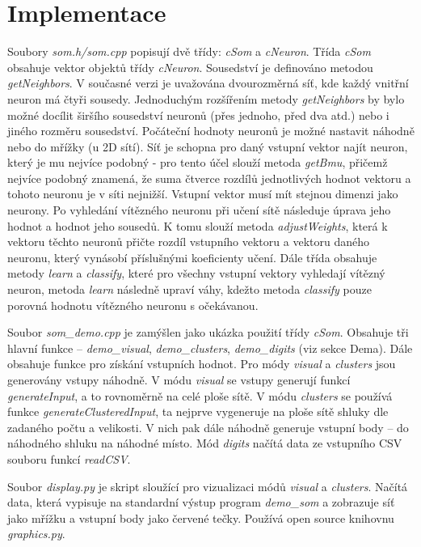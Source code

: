 \documentclass[12pt]{article}
\begin{document}
\section*{Implementace}
Soubory \textit{som.h/som.cpp} popisují dvě třídy: \textit{cSom} a \textit{cNeuron}. Třída \textit{cSom} obsahuje vektor objektů třídy \textit{cNeuron}. Sousedství je definováno metodou \textit{getNeighbors}. V současné verzi je uvažována dvourozměrná síť, kde každý vnitřní neuron má čtyři sousedy. Jednoduchým rozšířením metody \textit{getNeighbors} by bylo možné docílit širšího sousedství neuronů (přes jednoho, před dva atd.) nebo i jiného rozměru sousedství. Počáteční hodnoty neuronů je možné nastavit náhodně nebo do mřížky (u 2D sítí). Síť je schopna pro daný vstupní vektor najít neuron, který je mu nejvíce podobný - pro tento účel slouží metoda \textit{getBmu}, přičemž nejvíce podobný znamená, že suma čtverce rozdílů jednotlivých hodnot vektoru a tohoto neuronu je v síti nejnižší. Vstupní vektor musí mít stejnou dimenzi jako neurony. Po vyhledání vítězného neuronu při učení sítě následuje úprava jeho hodnot a hodnot jeho sousedů. K tomu slouží metoda \textit{adjustWeights}, která k vektoru těchto neuronů přičte rozdíl vstupního vektoru a vektoru daného neuronu, který vynásobí příslušnými koeficienty učení. Dále třída obsahuje metody \textit{learn} a \textit{classify}, které pro všechny vstupní vektory vyhledají vítězný neuron, metoda \textit{learn} následně upraví váhy, kdežto metoda \textit{classify} pouze porovná hodnotu vítězného neuronu s očekávanou.

Soubor \textit{som\_demo.cpp} je zamýšlen jako ukázka použití třídy \textit{cSom}. Obsahuje tři hlavní funkce -- \textit{demo\_visual}, \textit{demo\_clusters}, \textit{demo\_digits} (viz sekce Dema). Dále obsahuje funkce pro získání vstupních hodnot. Pro módy \textit{visual} a \textit{clusters} jsou generovány vstupy náhodně. V módu \textit{visual} se vstupy generují funkcí \textit{generateInput}, a to rovnoměrně na celé ploše sítě. V módu \textit{clusters} se používá funkce \textit{generateClusteredInput}, ta nejprve vygeneruje na ploše sítě shluky dle zadaného počtu a velikosti. V nich pak dále náhodně generuje vstupní body -- do náhodného shluku na náhodné místo. Mód \textit{digits} načítá data ze vstupního CSV souboru funkcí \textit{readCSV}.

Soubor \textit{display.py} je skript sloužící pro vizualizaci módů \textit{visual} a \textit{clusters}. Načítá data, která vypisuje na standardní výstup program \textit{demo\_som} a zobrazuje síť jako mřížku a vstupní body jako červené tečky. Používá open source knihovnu \textit{graphics.py}.
\end{document}
